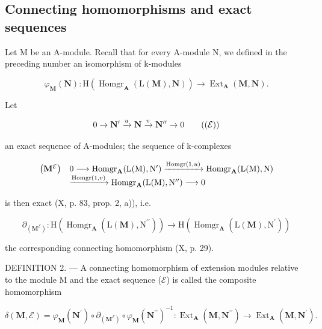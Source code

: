 \subsection{Connecting homomorphisms and exact sequences}

Let M be an A-module. Recall that for every A-module N, we defined in the preceding number an isomorphism of k-modules

\[
\varphi_ {\mathbf {M}} (\mathbf {N}): \mathrm{H} (\operatorname{Homgr} _ {\mathbf {A}} (\mathrm{L} (\mathbf {M}), \mathbf {N})) \rightarrow \operatorname{Ext} _ {\mathbf {A}} (\mathbf {M}, \mathbf {N}).
\]

Let

\[
0 \to \mathbf {N} ^ {\prime} \xrightarrow {u} \mathbf {N} \xrightarrow {v} \mathbf {N} ^ {\prime \prime} \to 0\tag{$(\mathcal{E})$}
\]

an exact sequence of A-modules; the sequence of k-complexes

\[
\begin{array}{r l} \left(\mathbf {M} ^ {\mathcal {E}}\right) & 0 \longrightarrow \operatorname{Homgr} _ {\mathbf {A}} (\mathrm{L} (\mathrm{M}), \mathrm{N} ^ {\prime}) \xrightarrow {\operatorname{Homgr} (1 , u)} \operatorname{Homgr} _ {\mathbf {A}} (\mathrm{L} (\mathrm{M}), \mathrm{N}) \\ & \xrightarrow {\operatorname{Homgr} (1 , v)} \operatorname{Homgr} _ {\mathbf {A}} (\mathrm{L} (\mathrm{M}), \mathrm{N} ^ {\prime \prime}) \longrightarrow 0 \end{array}
\]

is then exact (X, p. 83, prop. 2, a)), i.e.

\[
\partial_ {(\mathbf {M} ^ {\mathcal {E}})}: \mathrm{H} (\operatorname{Homgr} _ {\mathbf {A}} (\mathrm{L} (\mathbf {M}), \mathrm{N} ^ {\prime \prime})) \rightarrow \mathrm{H} (\operatorname{Homgr} _ {\mathbf {A}} (\mathrm{L} (\mathbf {M}), \mathrm{N} ^ {\prime}))
\]

the corresponding connecting homomorphism (X, p. 29).

DEFINITION 2. --- A connecting homomorphism of extension modules relative to the module M and the exact sequence (\(\mathcal{E}\)) is called the composite homomorphism

\[
\delta (\mathbf {M}, \mathcal {E}) = \varphi_ {\mathbf {M}} (\mathbf {N} ^ {\prime}) \circ \partial_ {(\mathbf {M} ^ {\mathcal {E}})} \circ \varphi_ {\mathbf {M}} (\mathbf {N} ^ {\prime \prime}) ^ {- 1}: \operatorname{Ext} _ {\mathbf {A}} (\mathbf {M}, \mathbf {N} ^ {\prime \prime}) \rightarrow \operatorname{Ext} _ {\mathbf {A}} (\mathbf {M}, \mathbf {N} ^ {\prime}).
\]

